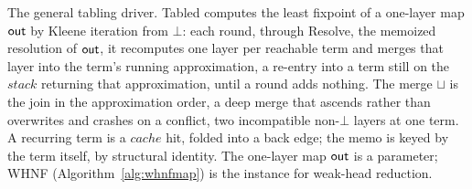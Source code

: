 \begin{algorithm*}
  \DontPrintSemicolon
  \caption{The general tabling driver. \textsf{Tabled} computes the least fixpoint of a one-layer map $\outm$ by Kleene iteration from $\bot$: each round, through \textsf{Resolve}, the memoized resolution of $\outm$, it recomputes one layer per reachable term and merges that layer into the term's running approximation, a re-entry into a term still on the $\mathit{stack}$ returning that approximation, until a round adds nothing. The merge $\sqcup$ is the join in the approximation order, a deep merge that ascends rather than overwrites and crashes on a conflict, two incompatible non-$\bot$ layers at one term. A recurring term is a $\mathit{cache}$ hit, folded into a back edge; the memo is keyed by the term itself, by structural identity. The one-layer map $\outm$ is a parameter; \textsf{WHNF} (Algorithm~\ref{alg:whnfmap}) is the instance for weak-head reduction.}
  \label{alg:whnf}
\end{algorithm*}

